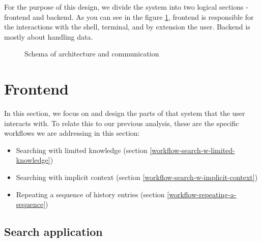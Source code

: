 For the purpose of this design, we divide the system into two logical sections - frontend and backend. As you can see in the figure \ref{design-architecture-layers}, frontend is responsible for the interactions with the shell, terminal, and by extension the user. Backend is mostly about handling data. 

\begin{figure}[h!]
\centering
  \caption{Schema of architecture and communication}
  \label{design-architecture-layers}
\end{figure}

\newpage
\section{Frontend}\label{design-frontend}

In this section, we focus on and design the parts of that system that the user interacts with. 
To relate this to our previous analysis, these are the specific workflows we are addressing in this section:

\begin{itemize}
    \item Searching with limited knowledge (section \ref{workflow-search-w-limited-knowledge})
    \item Searching with implicit context (section \ref{workflow-search-w-implicit-context})
    \item Repeating a sequence of history entries (section \ref{workflow-repeating-a-sequence})
\end{itemize}

\subsection{Search application}

